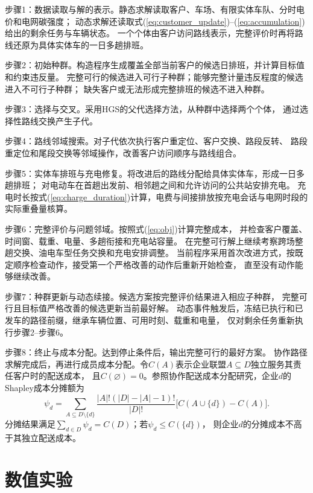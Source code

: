 \documentclass{setp-new}
\begin{document}
步骤1：数据读取与解的表示。静态求解读取客户、车场、有限实体车队、分时电价和电网碳强度；
动态求解还读取式(\ref{eq:customer_update})--(\ref{eq:accumulation})给出的剩余任务与车辆状态。
一个个体由客户访问路线表示，完整评价时再将路线还原为具体实体车的一日多趟排班。

步骤2：初始种群。构造程序生成覆盖全部当前客户的候选日排班，并计算目标值和约束违反量。
完整可行的候选进入可行子种群；能够完整计量违反程度的候选进入不可行子种群；
缺失客户或无法形成完整排班的候选不进入种群。

步骤3：选择与交叉。采用HGS的父代选择方法，从种群中选择两个个体，
通过选择性路线交换产生子代\cite{ref:76,ref:77}。

步骤4：路线邻域搜索。对子代依次执行客户重定位、客户交换、路段反转、
路段重定位和尾段交换等邻域操作\cite{ref:64,ref:76,ref:77}，改善客户访问顺序与路线组合。

步骤5：实体车排班与充电修复。将改进后的路线分配给具体实体车，形成一日多趟排班；
对电动车在首趟出发前、相邻趟之间和允许访问的公共站安排充电。
充电时长按式(\ref{eq:charge_duration})计算，电费与间接排放按充电会话与电网时段的实际重叠量核算。

步骤6：完整评价与问题邻域。按照式(\ref{eq:obj})计算完整成本，
并检查客户覆盖、时间窗、载重、电量、多趟衔接和充电站容量。
在完整可行解上继续考察跨场整趟交换、油电车型任务交换和充电安排调整。
当前程序采用首次改进方式，按既定顺序检查动作，接受第一个严格改善的动作后重新开始检查，
直至没有动作能够继续改善。

步骤7：种群更新与动态续接。候选方案按完整评价结果进入相应子种群，
完整可行且目标值严格改善的候选更新当前最好解。
动态事件触发后，冻结已执行和已发车的路径前缀，继承车辆位置、可用时刻、载重和电量，
仅对剩余任务重新执行步骤2--步骤6。

步骤8：终止与成本分配。达到停止条件后，输出完整可行的最好方案。
协作路径求解完成后，再进行成员成本分配。令$C(A)$表示企业联盟$A\subseteq D$独立服务其责任客户时的配送成本，
且$C(\varnothing)=0$。参照协作配送成本分配研究\cite{ref:7,ref:91}，企业$d$的Shapley成本分摊额为
\begin{equation}
\psi_d=\sum_{A\subseteq D\setminus\{d\}}
\frac{|A|!(|D|-|A|-1)!}{|D|!}
\bigl[C(A\cup\{d\})-C(A)\bigr].
\label{eq:shapley-cost}
\end{equation}
分摊结果满足$\sum_{d\in D}\psi_d=C(D)$；若$\psi_d\le C(\{d\})$，
则企业$d$的分摊成本不高于其独立配送成本。


\section{数值实验}
\end{document}
